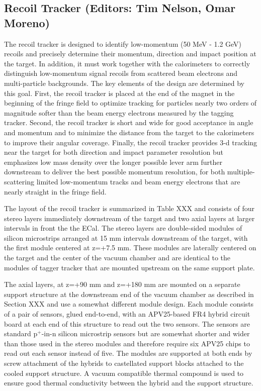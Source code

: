 
\subsection{Recoil Tracker (Editors: Tim Nelson, Omar Moreno)}

The recoil tracker is designed to identify low-momentum (50 MeV - 1.2 GeV) recoils and precisely determine their momentum, direction and impact position at the target.  In addition, it must work together with the calorimeters to correctly distinguish low-momentum signal recoils from scattered beam electrons and multi-particle backgrounds. The key elements of the design are determined by this goal.  First, the recoil tracker is placed at the end of the magnet in the beginning of the fringe field to optimize tracking for particles nearly two orders of magnitude softer than the beam energy electrons measured by the tagging tracker.  Second, the recoil tracker is short and wide for good acceptance in angle and momentum and to minimize the distance from the target to the calorimeters to improve their angular coverage. Finally, the recoil tracker provides 3-d tracking near the target for both direction and impact parameter resolution but emphasizes low mass density over the longer possible lever arm further downstream to deliver the best possible momentum resolution, for both multiple-scattering limited low-momentum tracks and beam energy electrons that are nearly straight in the fringe field.

The layout of the recoil tracker is summarized in Table XXX and consists of four stereo layers immediately downstream of the target and two axial layers at larger intervals in front the the ECal.  The stereo layers are double-sided modules of silicon microstrips arranged at 15 mm intervals downstream of the target, with the first module centered at z=+7.5 mm.  These modules are laterally centered on the target and the center of the vacuum chamber and are identical to the modules of tagger tracker that are mounted upstream on the same support plate.  

The axial layers, at z=+90 mm and z=+180 mm are mounted on a separate support structure at the downstream end of the vacuum chamber as described in Section XXX and use a somewhat different module design.  Each module consists of a pair of sensors, glued end-to-end, with an APV25-based FR4 hybrid circuit board at each end of this structure to read out the two sensors. The sensors are standard p$^{+}$-in-n silicon microstrip sensors but are somewhat shorter and wider than those used in the stereo modules and therefore require six APV25 chips to read out each sensor instead of five. The modules are supported at both ends by screw attachment of the hybrids to castellated support blocks attached to the cooled support structure. A vacuum compatible thermal compound is used to ensure good thermal conductivity between the hybrid and the support structure.
